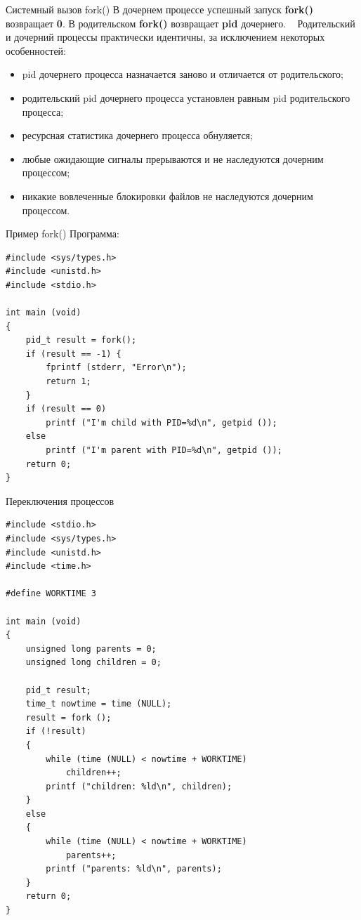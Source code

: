 \documentclass[xcolor=table]{beamer}
\begin{document}
\begin{frame}{Системный вызов fork()}
	В дочернем процессе успешный запуск \textbf{fork()} возвращает \textbf{0}. В родительском \textbf{fork()} возвращает \textbf{pid} дочернего. 
	~
	Родительский и дочерний процессы практически идентичны, за исключением некоторых особенностей:
	\begin{itemize}
		\item pid дочернего процесса назначается заново и отличается от родительского;
		\item родительский pid дочернего процесса установлен равным pid родительского процесса;
		\item ресурсная статистика дочернего процесса обнуляется;
		\item любые ожидающие сигналы прерываются и не наследуются дочерним процессом;
		\item никакие вовлеченные блокировки файлов не наследуются дочерним процессом.
	\end{itemize}
\end{frame}

\begin{frame}{Пример fork()}
	Программа:
	\begin{verbatim}
#include <sys/types.h>
#include <unistd.h>
#include <stdio.h>

int main (void)
{
    pid_t result = fork();
    if (result == -1) {
        fprintf (stderr, "Error\n");
        return 1;
    }
    if (result == 0)
        printf ("I'm child with PID=%d\n", getpid ());
    else
        printf ("I'm parent with PID=%d\n", getpid ());    
    return 0;
}
	\end{verbatim}
\end{frame}

\begin{frame}{Переключения процессов}
	\begin{verbatim}
#include <stdio.h>
#include <sys/types.h>
#include <unistd.h>
#include <time.h>

#define WORKTIME 3

int main (void)
{
    unsigned long parents = 0;
    unsigned long children = 0;

    pid_t result;    
    time_t nowtime = time (NULL);    
    result = fork ();    
    if (!result) 
    {
        while (time (NULL) < nowtime + WORKTIME) 
            children++;
        printf ("children: %ld\n", children);
    } 
    else 
    {
        while (time (NULL) < nowtime + WORKTIME) 
            parents++;
        printf ("parents: %ld\n", parents);
    }    
    return 0;
}
	\end{verbatim}
\end{frame}
\end{document}
